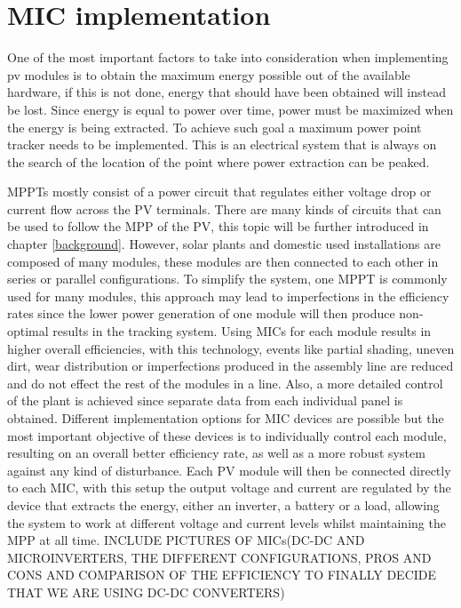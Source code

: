 
\section{MIC implementation}
One of the most important factors to take into consideration when implementing pv modules is to obtain the maximum energy possible out of the available hardware, if this is not done, energy that should have been obtained will instead be lost. Since energy is equal to power over time, power must be maximized when the energy is being extracted. To achieve such goal a maximum power point tracker needs to be implemented. This is an electrical system that is always on the search of the location of the point where power extraction can be peaked. 

MPPTs mostly consist of a power circuit that regulates either voltage drop or current flow across the PV terminals. There are many kinds of circuits that can be used to follow the MPP of the PV, this topic will be further introduced in chapter \ref{background}.
However, solar plants and domestic used installations are composed of many modules, these modules are then connected to each other in series or parallel configurations. To simplify the system, one MPPT is commonly used for many modules, this approach may lead to imperfections in the efficiency rates since the lower power generation of one module will then produce non-optimal results in the tracking system. 
Using MICs for each module results in higher overall efficiencies, with this technology, events like partial shading, uneven dirt, wear distribution or imperfections produced in the assembly line are reduced and do not effect the rest of the modules in a line. Also, a more detailed control of the plant is achieved since separate data from each individual panel is obtained.
Different implementation options for MIC devices are possible but the most important objective of these devices is to individually control each module, resulting on an overall better efficiency rate, as well as a more robust system against any kind of disturbance. Each PV module will then be connected directly to each MIC, with this setup the output voltage and current are regulated by the device that extracts the energy, either an inverter, a battery or a load, allowing the system to work at different voltage and current levels whilst maintaining the MPP at all time. INCLUDE PICTURES OF MICs(DC-DC AND MICROINVERTERS, THE DIFFERENT CONFIGURATIONS, PROS AND CONS AND COMPARISON OF THE EFFICIENCY TO FINALLY DECIDE THAT WE ARE USING DC-DC CONVERTERS)



